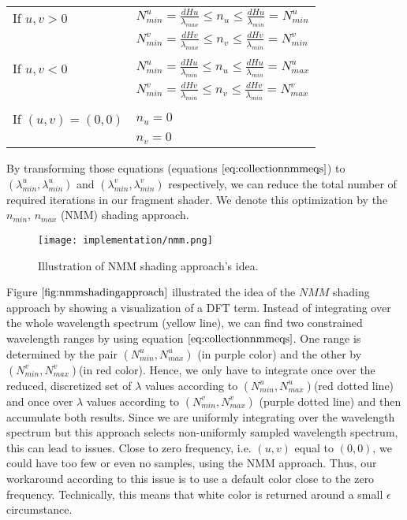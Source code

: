 \label{eq:collectionnmmeqs}
\begin{table}[H]
  \centering 
  \begin{tabular}{l l}
    If $u,v > 0$ & $N_{min}^{u} = \frac{dH u}{\lambda_{max}} \leq n_{u} \leq \frac{dH u}{\lambda_{min}} = N_{min}^{u}$ \\  
    & $N_{min}^{v} = \frac{dH v}{\lambda_{max}} \leq n_{v} \leq \frac{dH v}{\lambda_{min}} = N_{min}^{v}$ \\
    & \\
    If $u,v < 0$ & $N_{min}^{u} = \frac{dH u}{\lambda_{min}} \leq n_{u} \leq \frac{dH u}{\lambda_{min}} = N_{max}^{u}$ \\
    & $N_{min}^{v} = \frac{dH v}{\lambda_{min}} \leq n_{v} \leq \frac{dH v}{\lambda_{min}} = N_{max}^{v}$ \\
    & \\
    If $(u,v)=(0,0)$ & $n_u = 0$ \\
    & $n_v = 0$ \\  
  \end{tabular} 
\end{table}

By transforming those equations (equations $\ref{eq:collectionnmmeqs}$) to $(\lambda_{min}^{u}, \lambda_{min}^{u})$ and $(\lambda_{min}^{v}, \lambda_{min}^{v})$ respectively, we can reduce the total number of required iterations in our fragment shader. We denote this optimization by the $n_{min}$, $n_{max}$ (NMM) shading approach. 

\begin{figure}[H]
  \centering
  \texttt{[image: implementation/nmm.png]}
  \caption[NMM Shading Approach]{Illustration of NMM shading approach's idea.}
  \label{fig:nmmshadingapproach}
\end{figure}

Figure $\ref{fig:nmmshadingapproach}$ illustrated the idea of the $NMM$ shading approach by showing a visualization of a DFT term. Instead of integrating over the whole wavelength spectrum (yellow line), we can find two constrained wavelength ranges by using equation $\ref{eq:collectionnmmeqs}$. One range is determined by the pair $(N_{min}^{u}, N_{max}^{u})$ (in purple color) and the other by $(N_{min}^{v}, N_{max}^{v})$(in red color). Hence, we only have to integrate once over the reduced, discretized set of $\lambda$ values according to $(N_{min}^{u}, N_{max}^{u})$(red dotted line) and once over $\lambda$ values according to $(N_{min}^{v}, N_{max}^{v})$ (purple dotted line) and then accumulate both results. Since we are uniformly integrating over the wavelength spectrum but this approach selects non-uniformly sampled wavelength spectrum, this can lead to issues. Close to zero frequency, i.e. $(u,v)$ equal to $(0,0)$, we could have too few or even no samples, using the NMM approach. Thus, our workaround according to this issue is to use a default color close to the zero frequency. Technically, this means that white color is returned around a small $\epsilon$ circumstance.

